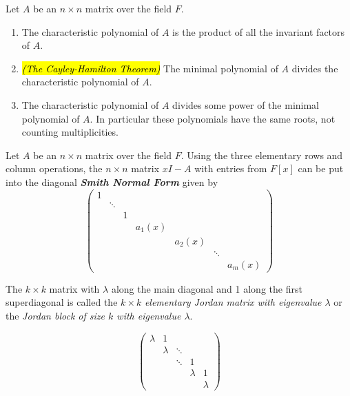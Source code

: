 \nl

\begin{prop}
Let $A$ be an $n\times n$ matrix over the field $F$.
\begin{enumerate}
\item The characteristic polynomial of $A$ is the product of all the invariant factors of $A$.
\item \hl{\textit{(The Cayley-Hamilton Theorem)}} The minimal polynomial of $A$ divides the characteristic polynomial of $A$.
\item The characteristic polynomial of $A$ divides some power of the minimal polynomial of $A$. In particular these polynomials have the same roots, not counting multiplicities.
\end{enumerate}
\end{prop}

\nl

\begin{thm}
Let $A$ be an $n\times n$ matrix over the field $F$. Using the three elementary rows and column operations, the $n\times n$ matrix $xI - A$ with entries from $F[x]$ can be put into the diagonal \textit{\textbf{Smith Normal Form}} given by 
\[\begin{pmatrix}
1 & & & & & & \\
& \ddots & & & & & \\
& & 1 & & & & \\
& & & a_1(x) & & & \\
& & & & a_2(x) & & \\
& & & & & \ddots & \\
& & & & & & a_m(x)
\end{pmatrix}\]
\end{thm}

\nl

\begin{defn}
The $k\times k$ matrix with $\lambda$ along the main diagonal and 1 along the first superdiagonal is called the $k\times k$ \textit{elementary Jordan matrix with eigenvalue $\lambda$} or the \textit{Jordan block of size $k$ with eigenvalue $\lambda$}.
\end{defn}

\[\begin{pmatrix}
\lambda & 1 & & & \\
 & \lambda & \ddots & &\\
 & & \ddots & 1 & \\
 & & & \lambda & 1\\
 & & & & \lambda
\end{pmatrix}\]

